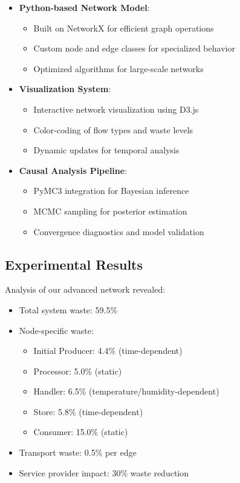 \documentclass[12pt]{article}
\theoremstyle{definition}
\begin{document}
\begin{itemize}
    \item \textbf{Python-based Network Model}: 
    \begin{itemize}
        \item Built on NetworkX for efficient graph operations
        \item Custom node and edge classes for specialized behavior
        \item Optimized algorithms for large-scale networks
    \end{itemize}
    
    \item \textbf{Visualization System}: 
    \begin{itemize}
        \item Interactive network visualization using D3.js
        \item Color-coding of flow types and waste levels
        \item Dynamic updates for temporal analysis
    \end{itemize}
    
    \item \textbf{Causal Analysis Pipeline}:
    \begin{itemize}
        \item PyMC3 integration for Bayesian inference
        \item MCMC sampling for posterior estimation
        \item Convergence diagnostics and model validation
    \end{itemize}
\end{itemize}

\subsection{Experimental Results}
Analysis of our advanced network revealed:
\begin{itemize}
    \item Total system waste: 59.5\%
    \item Node-specific waste:
        \begin{itemize}
            \item Initial Producer: 4.4\% (time-dependent)
            \item Processor: 5.0\% (static)
            \item Handler: 6.5\% (temperature/humidity-dependent)
            \item Store: 5.8\% (time-dependent)
            \item Consumer: 15.0\% (static)
        \end{itemize}
    \item Transport waste: 0.5\% per edge
    \item Service provider impact: 30\% waste reduction
\end{itemize}
\end{document}
